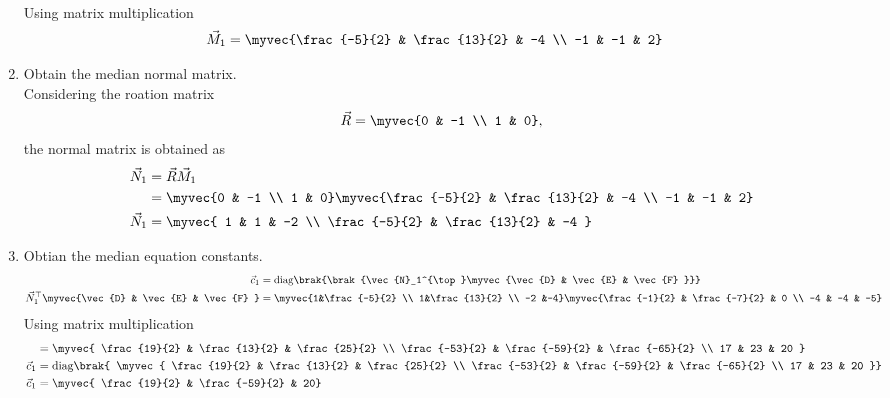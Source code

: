\documentclass[11pt]{book}
\begin{document}
\begin{enumerate}[label=\thesubsection.\arabic*.,ref=\thesubsection.\theenumi]
\begin{align}
{				  } 
		\end{align}
  Using matrix multiplication 
  \begin{align}
   \vec{M}_1 &=   \myvec{\frac{-5}{2} & \frac{13}{2} & -4 \\ -1 & -1 & 2}
  \end{align}
\item Obtain the median normal matrix. \\
\solution Considering the roation matrix
\begin{align}
\vec{R}  = \myvec{0 & -1 \\ 1 & 0},
\end{align}
the normal matrix is obtained as
\begin{align}
\vec{N}_1 &= \vec{R}\vec{M}_1  \\
&=\myvec{0 & -1 \\ 1 & 0} \myvec{\frac{-5}{2} & \frac{13}{2} & -4 \\ -1 & -1 & 2} \\
\vec{N}_1 &=  \myvec{ 1 & 1 & -2 \\ \frac{-5}{2} & \frac{13}{2} & -4 }
\end{align}
\item Obtian the median equation constants. \\
\begin{align}
\vec{c}_1 &= \text{diag}\brak{\brak{\vec{N}_1^{\top}\myvec{\vec{D} & \vec{E} & \vec{F} }}}  \\
\vec{N}_1^{\top}\myvec{\vec{D} & \vec{E} & \vec{F} } &= \myvec{1&\frac{-5}{2} \\ 1&\frac{13}{2} \\ -2 &-4}\myvec{\frac{-1}{2} & \frac{-7}{2} & 0 \\ -4 & -4 & -5} \\
\end{align}
Using matrix multiplication
\begin{align}
    &=\myvec{ \frac{19}{2} & \frac{13}{2} & \frac{25}{2} \\ \frac{-53}{2} & \frac{-59}{2} & \frac{-65}{2} \\ 17 & 23 & 20 } \\
    \vec{c}_1 &= \text{diag}\brak{ \myvec{ \frac{19}{2} & \frac{13}{2} & \frac{25}{2} \\ \frac{-53}{2} & \frac{-59}{2} & \frac{-65}{2} \\ 17 & 23 & 20 }} \\
    \vec{c}_1 &= \myvec{ \frac{19}{2} & \frac{-59}{2} & 20}
\end{align}

\end{enumerate}
\end{document}
